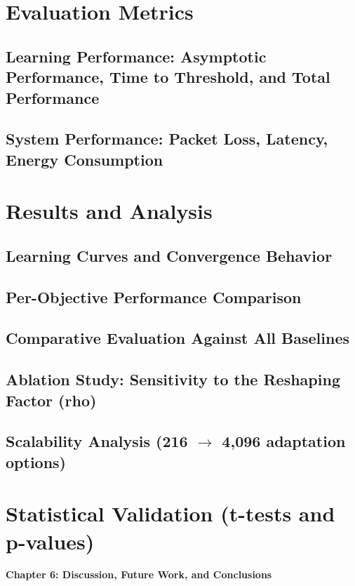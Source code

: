 \documentclass[11pt,a4paper]{article}
\begin{document}
\section{Evaluation Metrics}
\subsection{Learning Performance: Asymptotic Performance, Time to Threshold, and Total Performance}
\subsection{System Performance: Packet Loss, Latency, Energy Consumption}

\section{Results and Analysis}
\subsection{Learning Curves and Convergence Behavior}
\subsection{Per-Objective Performance Comparison}
\subsection{Comparative Evaluation Against All Baselines}
\subsection{Ablation Study: Sensitivity to the Reshaping Factor (rho)}
\subsection{Scalability Analysis (216 $\rightarrow$ 4,096 adaptation options)}

\section{Statistical Validation (t-tests and p-values)}

\newpage

\vspace*{1cm}
{\centering \huge \textbf{Chapter 6: Discussion, Future Work, and Conclusions} \par}
\vspace{1cm}
\end{document}
